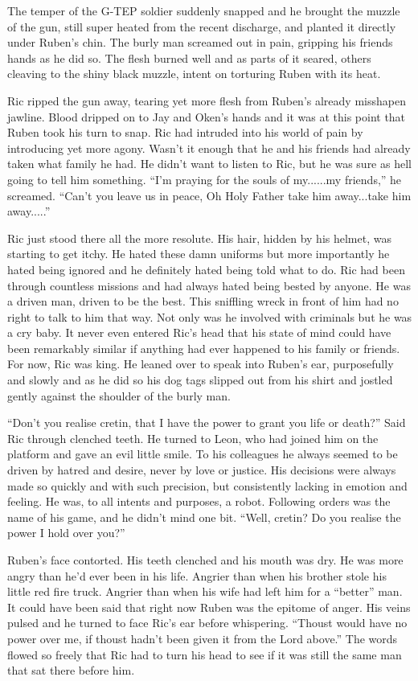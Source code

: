 The temper of the G-TEP soldier suddenly snapped and he brought the muzzle of the gun, still super heated from the recent discharge, and planted it directly under Ruben's chin.  The burly man screamed out in pain, gripping his friends hands as he did so.  The flesh burned well and as parts of it seared, others cleaving to the shiny black muzzle, intent on torturing Ruben with its heat.  

Ric ripped the gun away, tearing yet more flesh from Ruben's already misshapen jawline.  Blood dripped on to Jay and Oken's hands and it was at this point that Ruben took his turn to snap.  Ric had intruded into his world of pain by introducing yet more agony.  Wasn't it enough that he and his friends had already taken what family he had.  He didn't want to listen to Ric, but he was sure as hell going to tell him something.  ``I'm praying for the souls of my......my friends,'' he screamed.  ``Can't you leave us in peace, Oh Holy Father take him away...take him away.....'' 

Ric just stood there all the more resolute.  His hair, hidden by his helmet, was starting to get itchy.  He hated these damn uniforms but more importantly he hated being ignored and he definitely hated being told what to do.  Ric had been through countless missions and had always hated being bested by anyone.  He was a driven man, driven to be the best.  This sniffling wreck in front of him had no right to talk to him that way.  Not only was he involved with criminals but he was a cry baby.  It never even entered Ric's head that his state of mind could have been remarkably similar if anything had ever happened to his family or friends.  For now, Ric was king.  He leaned over to speak into Ruben's ear, purposefully and slowly and as he did so his dog tags slipped out from his shirt and jostled gently against the shoulder of the burly man.

``Don't you realise cretin, that I have the power to grant you life or death?''  Said Ric through clenched teeth.  He turned to Leon, who had joined him on the platform and gave an evil little smile.  To his colleagues he always seemed to be driven by hatred and desire, never by love or justice.  His decisions were always made so quickly and with such precision, but consistently lacking in emotion and feeling.  He was, to all intents and purposes, a robot.  Following orders was the name of his game, and he didn't mind one bit.  ``Well, cretin?  Do you realise the power I hold over you?''

Ruben's face contorted.  His teeth clenched and his mouth was dry.  He was more angry than he'd ever been in his life.  Angrier than when his brother stole his little red fire truck.  Angrier than when his wife had left him for a ``better'' man.  It could have been said that right now Ruben was the epitome of anger.  His veins pulsed and he turned to face Ric's ear before whispering.  ``Thoust would have no power over me, if thoust hadn't been given it from the Lord above.''  The words flowed so freely that Ric had to turn his head to see if it was still the same man that sat there before him.  

